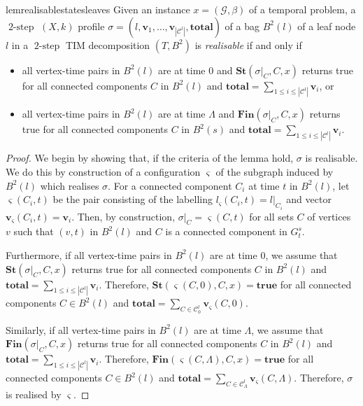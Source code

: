 \documentclass[a4paper,UKenglish,cleveref, autoref, thm-restate]{lipics-v2021} %
\DeclareMathOperator{\twostep}{2-step}
\begin{document}
\begin{toappendix}
\begin{restatable}{lem}{realisablestatesleaves}
    \label{lem:realisable-states-leaves}
    Given an instance $x=(\mathcal{G},\beta)$ of a temporal problem, a $\twostep$ $(X,k)$ profile $\sigma=(l, \textbf{v}_{1},\ldots, \textbf{v}_{|\mathcal{C}^l|}, \textbf{total})$ of a bag $B^2(l)$ of a leaf node $l$ in a $\twostep$ TIM decomposition $(T,B^2)$ is \emph{realisable} if and only if 
   \begin{itemize}
       \item all vertex-time pairs in $B^2(l)$ are at time $0$ and $\textbf{St}(\sigma|_{C}, C,x)$ returns true for all connected components $C$ in $B^2(l)$ and $\textbf{total}=\sum_{1\leq i\leq |\mathcal{C}^l|} \textbf{v}_{i}$, or 
       \item all vertex-time pairs in $B^2(l)$ are at time $\Lambda$ and $\textbf{Fin}(\sigma|_{C}, C,x)$ returns true for all connected components $C$ in $B^2(s)$ and $\textbf{total}=\sum_{1\leq i\leq |\mathcal{C}^l|} \textbf{v}_{i}$.
        \end{itemize}
\end{restatable}
\begin{proof}
    We begin by showing that, if the criteria of the lemma hold, $\sigma$ is realisable. We do this by construction of a configuration $\varsigma$ of the subgraph induced by $B^2(l)$ which realises $\sigma$. For a connected component $C_i$ at time $t$ in $B^2(l)$, let $\varsigma(C_i,t)$ be the pair consisting of the labelling $l_{\varsigma}(C_i,t)=l|_{C_i}$ and vector $\textbf{v}_{\varsigma}(C_i,t)=\textbf{v}_i$. Then, by construction, $\sigma|_C=\varsigma(C,t)$ for all sets $C$ of vertices $v$ such that $(v,t)$ in $B^2(l)$ and $C$ is a connected component in $G^s_t$. 

    Furthermore, if all vertex-time pairs in $B^2(l)$ are at time $0$, we assume that $\textbf{St}(\sigma|_{C},C,x)$ returns true for all connected components $C$ in $B^2(l)$ and $\textbf{total}=\sum_{1\leq i\leq |\mathcal{C}^l|} \textbf{v}_{i}$. Therefore, $\textbf{St}(\varsigma(C,0), C,x)=\textbf{true}$ for all connected components $C\in B^2(l)$ and $\textbf{total}=\sum_{C\in\mathcal{C}^l_0}\textbf{v}_{\varsigma}(C,0)$.

    Similarly, if all vertex-time pairs in $B^2(l)$ are at time $\Lambda$, we assume that $\textbf{Fin}(\sigma|_{C},C,x)$ returns true for all connected components $C$ in $B^2(l)$ and $\textbf{total}=\sum_{1\leq i\leq |\mathcal{C}^l|} \textbf{v}_{i}$. Therefore, $\textbf{Fin}(\varsigma(C,\Lambda), C,x)=\textbf{true}$ for all connected components $C\in B^2(l)$ and $\textbf{total}=\sum_{C\in\mathcal{C}^l_{\Lambda}}\textbf{v}_{\varsigma}(C,\Lambda)$. Therefore, $\sigma$ is realised by $\varsigma$.


\end{proof}
\end{toappendix}
\end{document}
